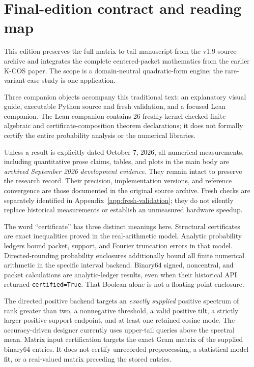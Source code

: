 \documentclass[11pt]{article}
\theoremstyle{definition}
\theoremstyle{remark}
\begin{document}
\section*{Final-edition contract and reading map}
This edition preserves the full matrix-to-tail manuscript from the v1.9
source archive and integrates the complete centered-packet mathematics from
the earlier K-COS paper.  The scope is a domain-neutral quadratic-form
engine; the rare-variant case study is one application.

Three companion objects accompany this traditional text: an explanatory
visual guide, executable Python source and fresh validation, and a focused
Lean companion.  The Lean companion contains 26 freshly kernel-checked finite algebraic and
certificate-composition theorem declarations; it does not formally certify the entire
probability analysis or the numerical libraries.

Unless a result is explicitly dated October 7, 2026, all numerical
measurements, including quantitative prose claims, tables, and plots in the
main body are \emph{archived September 2026 development evidence}.
They remain intact to preserve the research record.  Their precision,
implementation versions, and reference convergence are those documented in
the original source archive.  Fresh checks are separately identified in
Appendix~\ref{app:fresh-validation}; they do not silently replace historical
measurements or establish an unmeasured hardware speedup.

The word ``certificate'' has three distinct meanings here.  Structural
certificates are exact inequalities proved in the real-arithmetic model.
Analytic probability ledgers bound packet, support, and Fourier truncation
errors in that model.  Directed-rounding probability enclosures additionally
bound all finite numerical arithmetic in the specific interval backend.
Binary64 signed, noncentral, and packet calculations are analytic-ledger
results, even when their historical API returned \texttt{certified=True}.
That Boolean alone is not a floating-point enclosure.

The directed positive backend targets an \emph{exactly supplied} positive
spectrum of rank greater than two, a nonnegative threshold, a valid positive
tilt, a strictly larger positive support endpoint, and at least one retained
cosine mode.  The accuracy-driven designer currently uses upper-tail queries
above the spectral mean.  Matrix input certification targets the exact Gram
matrix of the supplied binary64 entries.  It does not certify unrecorded
preprocessing, a statistical model fit, or a real-valued matrix preceding the
stored entries.
\end{document}
